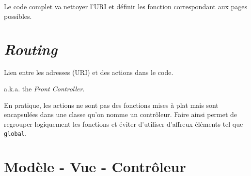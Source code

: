 \begin{english}

\begin{Shaded}
\begin{Highlighting}[]


\NormalTok{ = }\OtherTok{[}\OtherTok{],}
\NormalTok{ = }\OtherTok{[];}

\OtherTok{(}
    \OtherTok{,}
    \OtherTok{,}
\OtherTok{)}  \OtherTok{(}\OtherTok{);}

 \OtherTok{(}
    \OtherTok{[}\OtherTok{],}
    \OtherTok{[}\OtherTok{[}\OtherTok{]]}
\OtherTok{);}
\end{Highlighting}
\end{Shaded}

\end{english}

Le code complet va nettoyer l'URI et définir les fonction correspondant
aux pages possibles.

\hypertarget{routing}{%
\section{\texorpdfstring{\emph{Routing}}{Routing}}\label{routing}}

Lien entre les adresses (URI) et des actions dans le code.

a.k.a. the \emph{Front Controller}.

En pratique, les actions ne sont pas des fonctions mises à plat mais
sont encapsulées dans une classe qu'on nomme un contrôleur. Faire ainsi
permet de regrouper logiquement les fonctions et éviter d'utiliser
d'affreux éléments tel que \textenglish{\texttt{global}}.

\hypertarget{moduxe8le---vue---contruxf4leur}{%
\section{Modèle - Vue -
Contrôleur}\label{moduxe8le---vue---contruxf4leur}}


